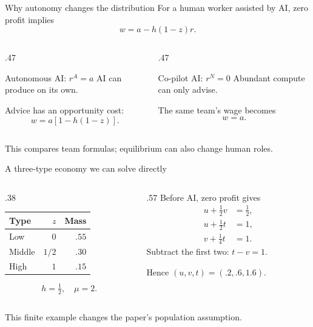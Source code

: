\documentclass[aspectratio=169,12pt]{beamer}
\begin{document}
\begin{frame}{Why autonomy changes the distribution}
For a human worker assisted by AI, zero profit implies
\[w=a-h(1-z)r.\]
\begin{columns}[T,onlytextwidth]
\begin{column}{.47\textwidth}
\begin{block}{Autonomous AI: $r^A=a$}
AI can produce on its own.\par\medskip
Advice has an opportunity cost:
\[w=a[1-h(1-z)].\]
\end{block}
\end{column}
\begin{column}{.47\textwidth}
\begin{block}{Co-pilot AI: $r^N=0$}
Abundant compute can only advise.\par\medskip
The same team's wage becomes
\[w=a.\]
\end{block}
\end{column}
\end{columns}
\medskip
This compares team formulas; equilibrium can also change human roles.
\end{frame}

\begin{frame}{A three-type economy we can solve directly}
\begin{columns}[c,onlytextwidth]
\begin{column}{.38\textwidth}
\begin{tabular}{lrr}\toprule
Type & $z$ & Mass\\\midrule
Low & $0$ & $.55$\\
Middle & $1/2$ & $.30$\\
High & $1$ & $.15$\\\bottomrule
\end{tabular}
\[h=\tfrac12,\quad\mu=2.\]
\end{column}
\begin{column}{.57\textwidth}
Before AI, zero profit gives
\begin{align*}
u+\tfrac12v&=\tfrac12,\\
u+\tfrac12t&=1,\\
v+\tfrac14t&=1.
\end{align*}
Subtract the first two: $t-v=1$.\par\medskip
Hence $(u,v,t)=(.2,.6,1.6)$.
\end{column}
\end{columns}
\vspace{4mm}
This finite example changes the paper's population assumption.
\end{frame}
\end{document}
